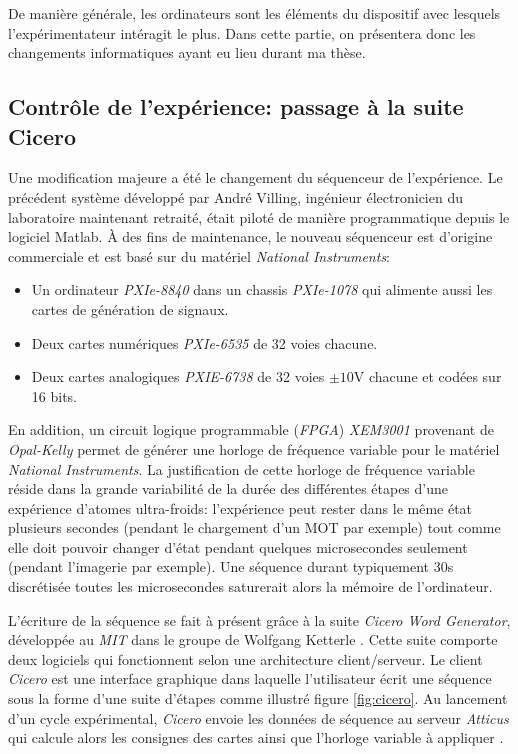 De manière générale, les ordinateurs sont les éléments du dispositif avec lesquels l'expérimentateur intéragit le plus. Dans cette partie, on présentera donc les changements informatiques ayant eu lieu durant ma thèse.

\subsection{Contrôle de l'expérience: passage à la suite Cicero}
\label{sc:cicero}
Une modification majeure a été le changement du séquenceur de l'expérience. Le précédent système développé par André Villing, ingénieur électronicien du laboratoire maintenant retraité, était piloté de manière programmatique depuis le logiciel Matlab. À des fins de maintenance, le nouveau séquenceur est d'origine commerciale et est basé sur du matériel \emph{National Instruments}:
\begin{itemize}
\item[\textendash] Un ordinateur \emph{PXIe-8840} dans un chassis \emph{PXIe-1078} qui alimente aussi les cartes de génération de signaux.
\item[\textendash] Deux cartes numériques \emph{PXIe-6535} de 32 voies chacune.
\item[\textendash] Deux cartes analogiques \emph{PXIE-6738} de 32 voies $\pm10$V chacune et codées sur 16 bits.
\end{itemize}
En addition, un circuit logique programmable (\emph{FPGA}) \emph{XEM3001} provenant de \emph{Opal-Kelly} permet de générer une horloge de fréquence variable pour le matériel \emph{National Instruments}. La justification de cette horloge de fréquence variable réside dans la grande variabilité de la durée des différentes étapes d'une expérience d'atomes ultra-froids: l'expérience peut rester dans le même état plusieurs secondes (pendant le chargement d'un MOT par exemple) tout comme elle doit pouvoir changer d'état pendant quelques microsecondes seulement (pendant l'imagerie par exemple). Une séquence durant typiquement 30s discrétisée toutes les microsecondes saturerait alors la mémoire de l'ordinateur. 

L'écriture de la séquence se fait à présent grâce à la suite \emph{Cicero Word Generator}, développée au \emph{MIT} dans le groupe de Wolfgang Ketterle \citep{keshet2013distributed}. Cette suite comporte deux logiciels qui fonctionnent selon une architecture client/serveur. Le client \emph{Cicero} est une interface graphique dans laquelle l'utilisateur écrit une séquence sous la forme d'une suite d'étapes comme illustré figure \ref{fig:cicero}. Au lancement d'un cycle expérimental, \emph{Cicero} envoie les données de séquence au serveur \emph{Atticus} qui calcule alors les consignes des cartes ainsi que l'horloge variable à appliquer \citep{keshet2008cicero}.

